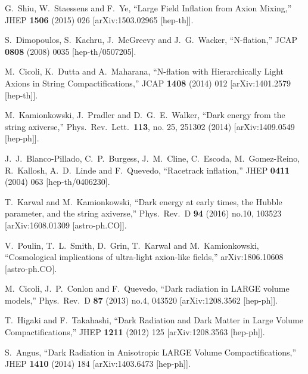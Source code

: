 \documentclass[11pt,a4paper]{article}
\begin{document}
\begin{itemize}
\begin{thebibliography}{99}
  G.~Shiu, W.~Staessens and F.~Ye,
  ``Large Field Inflation from Axion Mixing,''
  JHEP {\bf 1506} (2015) 026
  [arXiv:1503.02965 [hep-th]].
	
  S.~Dimopoulos, S.~Kachru, J.~McGreevy and J.~G.~Wacker,
  ``N-flation,''
  JCAP {\bf 0808} (2008) 0035
  [hep-th/0507205].
  
  M.~Cicoli, K.~Dutta and A.~Maharana,
  ``N-flation with Hierarchically Light Axions in String Compactifications,''
  JCAP {\bf 1408} (2014) 012
  [arXiv:1401.2579 [hep-th]].

  M.~Kamionkowski, J.~Pradler and D.~G.~E.~Walker,
  ``Dark energy from the string axiverse,''
  Phys.\ Rev.\ Lett.\  {\bf 113}, no. 25, 251302 (2014)
  [arXiv:1409.0549 [hep-ph]].

  J.~J.~Blanco-Pillado, C.~P.~Burgess, J.~M.~Cline, C.~Escoda, M.~Gomez-Reino, R.~Kallosh, A.~D.~Linde and F.~Quevedo,
  ``Racetrack inflation,''
  JHEP {\bf 0411} (2004) 063
  [hep-th/0406230].

  T.~Karwal and M.~Kamionkowski,
  ``Dark energy at early times, the Hubble parameter, and the string axiverse,''
  Phys.\ Rev.\ D {\bf 94} (2016) no.10,  103523
  [arXiv:1608.01309 [astro-ph.CO]].

  V.~Poulin, T.~L.~Smith, D.~Grin, T.~Karwal and M.~Kamionkowski,
  ``Cosmological implications of ultra-light axion-like fields,''
  arXiv:1806.10608 [astro-ph.CO].

  M.~Cicoli, J.~P.~Conlon and F.~Quevedo,
  ``Dark radiation in LARGE volume models,''
  Phys.\ Rev.\ D {\bf 87} (2013) no.4,  043520
  [arXiv:1208.3562 [hep-ph]].

  T.~Higaki and F.~Takahashi,
  ``Dark Radiation and Dark Matter in Large Volume Compactifications,''
  JHEP {\bf 1211} (2012) 125
  [arXiv:1208.3563 [hep-ph]].
	
  S.~Angus,
  ``Dark Radiation in Anisotropic LARGE Volume Compactifications,''
  JHEP {\bf 1410} (2014) 184
  [arXiv:1403.6473 [hep-ph]].	
	

\end{thebibliography}
\end{itemize}
\end{document}
